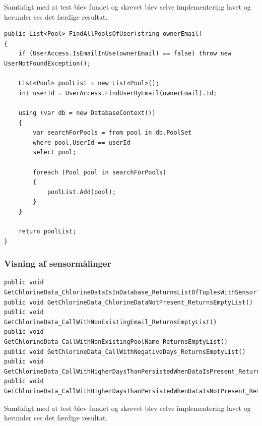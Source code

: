 Samtidigt med at test blev fundet og skrevet blev selve implementering lavet og herunder ses det færdige resultat.

\begin{lstlisting}
public List<Pool> FindAllPoolsOfUser(string ownerEmail)
{
	if (UserAccess.IsEmailInUse(ownerEmail) == false) throw new UserNotFoundException();
	
	List<Pool> poolList = new List<Pool>();
	int userId = UserAccess.FindUserByEmail(ownerEmail).Id;
	
	using (var db = new DatabaseContext())
	{
		var searchForPools = from pool in db.PoolSet
		where pool.UserId == userId
		select pool;
		
		foreach (Pool pool in searchForPools)
		{
			poolList.Add(pool);
		}
	}
	
	return poolList;
}
\end{lstlisting}

\subsubsection{Visning af sensormålinger}

\begin{lstlisting}
public void GetChlorineData_ChlorineDataIsInDatabase_ReturnsListOfTuplesWithSensorTypeAndValues()
public void GetChlorineData_ChlorineDataNotPresent_ReturnsEmptyList()
public void GetChlorineData_CallWithNonExistingEmail_ReturnsEmptyList()
public void GetChlorineData_CallWithNonExistingPoolName_ReturnsEmptyList()
public void GetChlorineData_CallWithNegativeDays_ReturnsEmptyList()
public void GetChlorineData_CallWithHigherDaysThanPersistedWhenDataIsPresent_ReturnsListWithOnlyDataPresent()
public void GetChlorineData_CallWithHigherDaysThanPersistedWhenDataIsNotPresent_ReturnsEmptyList()
\end{lstlisting}


Samtidigt med at test blev fundet og skrevet blev selve implementering lavet og herunder ses det færdige resultat.

